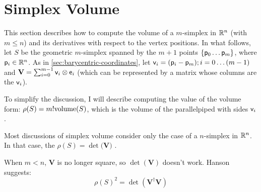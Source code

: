 
\section{Simplex Volume}
\label{sec:simplex_volume}

\nocite{graphics-gems-4-1994}
\nocite{goodman-orourke-hdcg-2004}

This section describes how to compute
the volume of a $m$-simplex in $\mathbb{R}^n$ (with $m \le n$)
and its derivatives with respect to the vertex positions.
In what follows, let $S$ be the geometric $m$-simplex
spanned by the $m+1$ points $\{\mathsf{p}_0  \ldots  \mathsf{p}_m\}$,
where $\mathsf{p}_i \in \mathbb{R}^n$.
As in \autoref{sec:barycentric-coordinates},
let $\mathsf{v}_i = (\mathsf{p}_i - \mathsf{p}_m); i = 0 \ldots (m-1)$
and ${\mathbf V} = \sum_{i=0}^{m-1} \mathsf{v}_i \otimes \mathsf{e}_i$
(which can be represented by a matrix whose columns are the $\mathsf{v}_i$).

To simplify the discussion, I will describe computing the
value of the volume form: $\rho(S) = m! \mathrm{volume}(S)$,
which is the volume of the parallelpiped with sides $\mathsf{v}_i$.

Most discussions of simplex volume consider
only the case of a $n$-simplex in $\mathbb{R}^n$.
In that case, the $\rho(S) = \det({\mathbf V)}$
\cite{henk-richter-gebet-ziegler-hdcg-16-2004}.

When $m < n$, ${\mathbf V}$ is no longer square,
so $\det({\mathbf V})$ doesn't work.
Hanson \cite{hanson-1994} suggests:
\begin{equation}
\rho(S)^2 = \det({\mathbf V}^{\dagger} {\mathbf V})
\end{equation}

